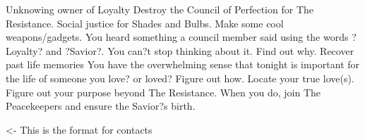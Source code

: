 \documentclass[char]{Silversiders}
\begin{document}
\name{\cIngenuity{}}

Unknowing owner of Loyalty
Destroy the Council of Perfection for The Resistance.
Social justice for Shades and Bulbs. Make some cool weapons/gadgets.
You heard something a council member said using the words ?Loyalty? and ?Savior?. You can?t stop thinking about it. Find out why.
Recover past life memories
You have the overwhelming sense that tonight is important for the life of someone you love? or loved? Figure out how. 
Locate your true love(s).
Figure out your purpose beyond The Resistance.
When you do, join The Peacekeepers and ensure the Savior?s birth.

\begin{itemz}[Goals]
	\item 
\end{itemz}

\begin{itemz}[Notes]
	\item 
\end{itemz}

\begin{contacts}
	\contact{\cTest{}} <- This is the format for contacts 
\end{contacts}
\end{document}
